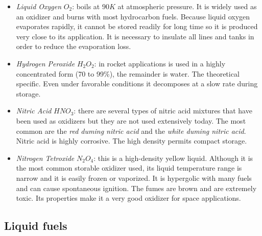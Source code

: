 \documentclass[12pt]{article}
\begin{document}
\begin{itemize}
    \item \textit{Liquid Oxygen} $O_{2}$: boils at $90 K$ at atmospheric pressure. It is widely used as an oxidizer and burns with most hydrocarbon fuels. Because liquid oxygen evaporates rapidly, it cannot be stored readily for long time so it is produced very close to its application. It is necessary to insulate all lines and tanks in order to reduce the evaporation loss.
    \item \textit{Hydrogen Peroxide} $H_{2}O_{2}$: in rocket applications is used in a highly concentrated form (70 to 99\%), the remainder is water. The theoretical specific. Even under favorable conditions it decomposes at a slow rate during storage.
    \item \textit{Nitric Acid} $HNO_{3}$: there are several types of nitric acid mixtures that have been used as oxidizers but they are not used extensively today. The most common are the \textit{red duming nitric acid} and the \textit{white duming nitric acid}. Nitric acid is highly corrosive. The high density permits compact storage.
    \item \textit{Nitrogen Tetroxide} $N_{2}O_{4}$: this is a high-density yellow liquid. Although it is the most common storable oxidizer used, its liquid temperature range is narrow and it is easily frozen or vaporized. It is hypergolic with many fuels and can cause spontaneous ignition. The fumes are brown and are extremely toxic. Its properties make it a very good oxidizer for space applications.
\end{itemize}

\subsection{Liquid fuels}
\end{document}
